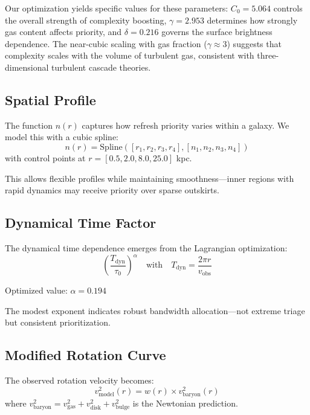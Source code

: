 \documentclass[twocolumn,prd,amsmath,amssymb,aps,superscriptaddress,nofootinbib]{revtex4-2}
\begin{document}
Our optimization yields specific values for these parameters: $C_0 = 5.064$ controls the overall strength of complexity boosting, $\gamma = 2.953$ determines how strongly gas content affects priority, and $\delta = 0.216$ governs the surface brightness dependence. The near-cubic scaling with gas fraction ($\gamma \approx 3$) suggests that complexity scales with the volume of turbulent gas, consistent with three-dimensional turbulent cascade theories.

\subsection{Spatial Profile}

The function $n(r)$ captures how refresh priority varies within a galaxy. We model this with a cubic spline:
\begin{equation}
n(r) = \text{Spline}([r_1, r_2, r_3, r_4], [n_1, n_2, n_3, n_4])
\end{equation}
with control points at $r = [0.5, 2.0, 8.0, 25.0]$ kpc.

This allows flexible profiles while maintaining smoothness---inner regions with rapid dynamics may receive priority over sparse outskirts.

\subsection{Dynamical Time Factor}

The dynamical time dependence emerges from the Lagrangian optimization:
\begin{equation}
\left(\frac{T_{\text{dyn}}}{\tau_0}\right)^\alpha \quad \text{with} \quad T_{\text{dyn}} = \frac{2\pi r}{v_{\text{obs}}}
\end{equation}

Optimized value: $\alpha = 0.194$

The modest exponent indicates robust bandwidth allocation---not extreme triage but consistent prioritization.

\subsection{Modified Rotation Curve}

The observed rotation velocity becomes:
\begin{equation}
v_{\text{model}}^2(r) = w(r) \times v_{\text{baryon}}^2(r)
\end{equation}
where $v_{\text{baryon}}^2 = v_{\text{gas}}^2 + v_{\text{disk}}^2 + v_{\text{bulge}}^2$ is the Newtonian prediction.
\end{document}
